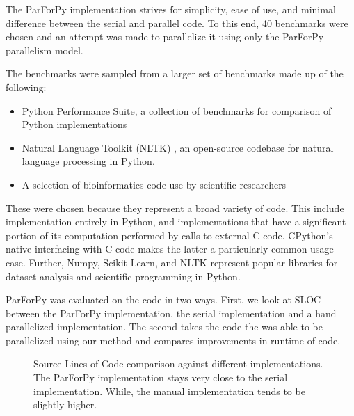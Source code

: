 \documentclass[conference]{IEEEtran}
\begin{document}
The ParForPy implementation strives for simplicity, ease of use, and minimal difference between the serial and parallel code.
To this end, 40 benchmarks were chosen and an attempt was made to parallelize it using only the ParForPy parallelism model.

The benchmarks were sampled from a larger set of benchmarks made up of the following:
\begin{itemize}
   \item Python Performance Suite\cite{pyPerformance}, a collection of benchmarks for comparison of Python implementations
   \item Natural Language Toolkit (NLTK) \cite{bird_2016}, an 
   open-source codebase for natural language processing in Python.
   \item A selection of bioinformatics code use by scientific researchers
\end{itemize}
These were chosen because they represent a broad variety of code. 
This include implementation entirely in Python, and implementations 
that have a significant portion of its computation performed by calls to external C code.
CPython's native interfacing with C code makes the latter a particularly common usage case.
Further, Numpy, Scikit-Learn, and NLTK represent popular libraries for dataset analysis and scientific programming in Python.


ParForPy was evaluated on the code in two ways. First, we look at SLOC between
the ParForPy implementation, the serial implementation and a hand parallelized implementation.
The second takes the code the was able to be parallelized using our method and compares improvements in runtime of code.

\begin{figure}[t]
\caption{Source Lines of Code comparison against different implementations.
The ParForPy implementation stays very close to the serial implementation. While,
the manual implementation tends to be slightly higher.}
\label{slocchart}
\end{figure}
\end{document}
